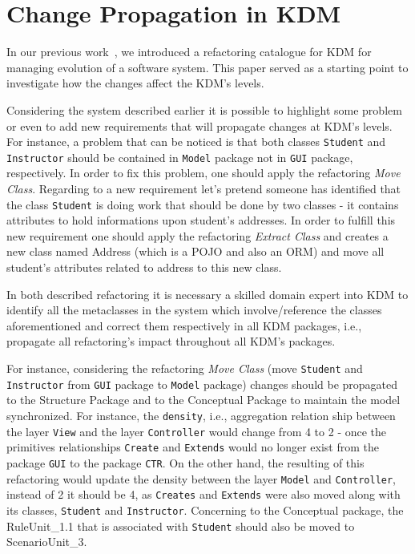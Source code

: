 \section{Change Propagation in KDM} %
\label{sec:motivation_and_running_example}

In our previous work~\cite{IRIDurelliCatalogo}, we introduced a refactoring catalogue for KDM for managing evolution of a software system. This paper served as a starting point to investigate how the changes affect the KDM's levels. 

Considering the system described earlier it is possible to highlight some problem or even to add new requirements that will propagate changes at KDM's levels. For instance, a problem that can be noticed is that both classes \texttt{Student} and \texttt{Instructor} should be contained in \texttt{Model} package not in \texttt{GUI} package, respectively. In order to fix this problem, one should apply the refactoring \textit{Move Class}.
%
%
%
%
Regarding to a new requirement let's pretend someone has identified that the class \texttt{Student} is doing work that should be done by two classes - it contains attributes to hold informations upon student's addresses. In order to fulfill this new requirement one should apply the refactoring \textit{Extract Class} and creates a new class named Address (which is a POJO and also an ORM) and move all student's attributes related to address to this new class.


In both described refactoring it is necessary a skilled domain expert into KDM to identify all the metaclasses in the system which involve/reference the classes aforementioned and correct them respectively in all KDM packages, i.e., propagate all refactoring's impact throughout all KDM's packages. 

For instance, considering the refactoring \textit{Move Class} (move \texttt{Student} and \texttt{Instructor} from \texttt{GUI} package to \texttt{Model} package) changes should be propagated to the Structure Package and to the Conceptual Package to maintain the model synchronized. For instance, the \texttt{density}, i.e., aggregation relation ship between the layer \texttt{View} and the layer \texttt{Controller} would change from 4 to 2 - once the primitives relationships \texttt{Create} and \texttt{Extends} would no longer exist from the package \texttt{GUI} to the package \texttt{CTR}. On the other hand, the resulting of this refactoring would update the density between the layer \texttt{Model} and \texttt{Controller}, instead of 2 it should be 4, as \texttt{Creates} and \texttt{Extends} were also moved along with its classes, \texttt{Student} and \texttt{Instructor}. Concerning to the Conceptual package, the  RuleUnit\_1.1 that is associated with \texttt{Student} should also be moved to ScenarioUnit\_3. 

